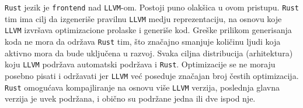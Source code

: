 \verb|Rust| jezik je \verb|frontend| nad \verb|LLVM|-om. Postoji puno olakšica u ovom pristupu.
\verb|Rust| tim ima cilj da izgeneriše pravilnu \verb|LLVM| medju reprezentaciju, na osnovu koje 
\verb|LLVM| izvršava optimizacione prolaske i generiše kod. Greške prilikom generisanja koda ne mora da 
održava \verb|Rust| tim, što značajno smanjuje količinu ljudi koja aktivno mora da bude uključena u razvoj. 
Svaka ciljna distribucija (arhitektura) koju \verb|LLVM| podržava automatski podržava i \verb|Rust|. Optimizacije se ne moraju 
posebno pisati i održavati jer \verb|LLVM| već poseduje značajan broj čestih optimizacija. \verb|Rust| 
omogućava kompajliranje na osnovu više \verb|LLVM| verzija, poslednja glavna verzija je uvek podržana,
i obično su podržane jedna ili dve ispod nje.
